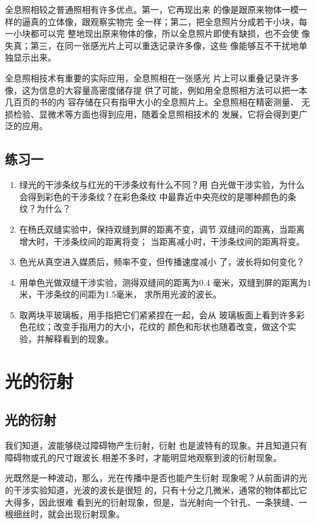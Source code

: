 全息照相较之普通照相有许多优点。第一，它再现出来
的像是跟原来物体一模一样的逼真的立体像，跟观察实物完
全一样；第二，把全息照片分成若干小块，每一小块都可以完
整地现出原来物体的像，所以全息照片即使有缺损，也不会使
像失真；第三，在同一张感光片上可以重迭记录许多像，这些
像能够互不干扰地单独显示出来。

全息照相技术有重要的实际应用，全息照相在一张感光
片上可以重叠记录许多像，这为信息的大容量高密度储存提
供了可能，例如用全息照相方法可以把一本几百页的书的内
容存储在只有指甲大小的全息照片上。全息照相在精密测量、
无损检验、显微术等方面也得到应用，随着全息照相技术的
发展，它将会得到更广泛的应用。

\subsection*{练习一}

\begin{enumerate}
\item 绿光的干涉条纹与红光的干涉条纹有什么不同？用
白光做干涉实验，为什么会得到彩色的干涉条纹？在彩色条纹
中最靠近中央亮纹的是哪种颜色的条纹？为什么？
\item 在杨氏双缝实验中，保持双缝到屏的距离不变，调节
双缝间的距离，当距离增大时，干涉条纹间的距离将变\underline{\qquad}；
当距离减小时，干涉条纹间的距离将变\underline{\qquad}。
\item 色光从真空进入媒质后，频率不变，但传播速度减小
了，波长将如何变化？
\item 用单色光做双缝干涉实验，测得双缝间的距离为0.4
毫米，双缝到屏的距离为1米，干涉条纹的间距为1.5毫米，
求所用光波的波长。
\item 取两块平玻璃板，用手指把它们紧紧捏在一起，会从
玻璃板面上看到许多彩色花纹；改变手指用力的大小，花纹的
颜色和形状也随着改变，做这个实验，并解释看到的现象。
\end{enumerate}

\section{光的衍射}
\subsection{光的衍射}

我们知道，波能够绕过障碍物产生衍射，衍射
也是波特有的现象。并且知道只有障碍物或孔的尺寸跟波长
相差不多时，才能明显地观察到波的衍射现象。

光既然是一种波动，那么，光在传播中是否也能产生衍射
现象呢？从前面讲的光的干涉实验知道，光波的波长是很短
的，只有十分之几微米，通常的物体都比它大得多，因此很难
看到光的衍射现象，但是，当光射向一个针孔、一条狭缝、一
根细丝时，就会出现衍射现象。

